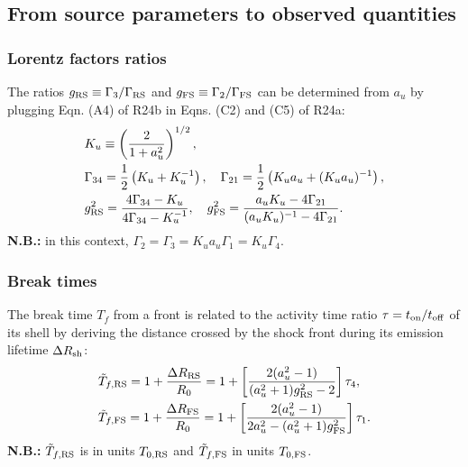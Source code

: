 \documentclass{article}
\newcommand{\on}{{\rm on}}
\newcommand{\off}{{\rm off}}
\newcommand{\sh}{{\rm sh}}
\newcommand{\RS}{{\rm RS}}
\newcommand{\FS}{{\rm FS}}
\begin{document}
\subsection{From source parameters to observed quantities}\label{sec:ratios}
\subsubsection{Lorentz factors ratios}
The ratios $g_\RS\equiv\Gamma_3/\Gamma_\RS$ and $g_\FS\equiv\Gamma_2/\Gamma_\FS$ can be determined from $a_u$ by plugging Eqn. (A4) of R24b in Eqns. (C2) and (C5) of R24a:
\begin{align}
    &K_u \equiv \left(\frac{2}{1+a_u^2}\right)^{1/2},\\
    &\Gamma_{34}=\frac{1}{2}\left(K_u+K_u^{-1}\right),\quad\Gamma_{21}=\frac{1}{2}\left(K_u a_u+(K_u a_u)^{-1}\right),\label{eqn:relLfacs}\\
    &g_\RS^2=\frac{4\Gamma_{34}-K_u}{4\Gamma_{34}-K_u^{-1}},\quad g_\FS^2=\frac{a_uK_u-4\Gamma_{21}}{(a_uK_u)^{-1}-4\Gamma_{21}}.\label{eqn:g2_from_au}
\end{align}
\textbf{N.B.:} in this context, $\Gamma_2=\Gamma_3=K_ua_u\Gamma_1=K_u\Gamma_4$.

\subsubsection{Break times}\label{sec:Tf_R24}
The break time $T_f$ from a front is related to the activity time ratio $\tau=t_\on/t_\off$ of its shell by deriving the distance crossed by the shock front during its emission lifetime $\Delta R_\sh$:
\begin{equation}
\begin{split}
    &\tilde{T}_{f,\RS} = 1 + \frac{\Delta R_\RS}{R_0} = 1 + \left[\frac{2(a_u^2-1)}{(a_u^2+1)g_\RS^2-2}\right]  \tau_4,\\
    &\tilde{T}_{f,\FS} = 1 + \frac{\Delta R_\FS}{R_0} = 1 + \left[\frac{2(a_u^2-1)}{2 a_u^2 - (a_u^2+1)g_\FS^2}\right] \tau_1.
\end{split}\label{eqn:Tf_from_tau}
\end{equation}
\textbf{N.B.:} $\tilde{T}_{f,\RS}$ is in units $T_{0,\RS}$ and $\tilde{T}_{f,\FS}$ in units $T_{0,\FS}$.
\end{document}

